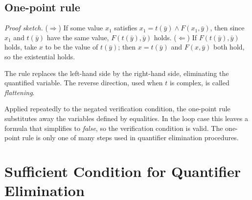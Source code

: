 \subsection*{One-point rule}
 
 
\noindent\emph{Proof sketch.} ($\Rightarrow$) If some value $x_1$ satisfies $x_1 = t(\bar y) \wedge F(x_1, \bar y)$, then since $x_1$ and $t(\bar y)$ have the same value, $F(t(\bar y), \bar y)$ holds. ($\Leftarrow$) If $F(t(\bar y), \bar y)$ holds, take $x$ to be the value of $t(\bar y)$; then $x = t(\bar y)$ and $F(x, \bar y)$ both hold, so the existential holds.
 
The rule replaces the left-hand side by the right-hand side, eliminating the quantified variable. The reverse direction, used when $t$ is complex, is called \emph{flattening}.
 
 
Applied repeatedly to the negated verification condition, the one-point rule substitutes away the variables defined by equalities. In the loop case this leaves a formula that simplifies to \emph{false}, so the verification condition is valid. The one-point rule is only one of many steps used in quantifier elimination procedures.
 
\section{Sufficient Condition for Quantifier Elimination}
 
 
